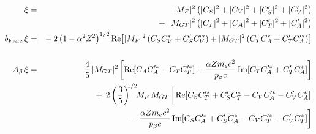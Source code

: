 %
%
%
\begin{eqnarray}
    \xi &=& 
    	|M_F|^2    \left( |C_S|^2 + |C_V|^2 + |C_S^\prime|^2 + |C_V^\prime|^2 \right) 
		\nonumber \\ && + \;\,
		|M_{GT}|^2 \left( |C_T|^2 + |C_A|^2 + |C_T^\prime|^2 + |C_A^\prime|^2 \right)
		\label{eq:jtw_xi_integrated} \\
    \bFierz \, \xi &=& 
    	- \: 2 %
		\left( 1-\alpha^2 Z^2 \right)^{1/2} 
		\textrm{Re}\!\left[ |M_F|^2 \left( C_S C_V^* + C_S^\prime C_V^{\prime *} \right) 
    	+ |M_{GT}|^2 \left( C_T C_A^* + C_T^{\prime} C_A^{\prime *} \right) \right] 
		\nonumber \\
    	\label{eq:jtw_bxi_integrated} \\
    \Abeta \, \xi &=& 
    	\frac{4}{5} \, |M_{GT}|^2 \left[ \textrm{Re}\!\left[ C_A C_A^{\prime *} - C_T C_T^{\prime *} \right] + \frac{\alpha Z \me c^2}{\pbeta c} \,\textrm{Im}\!\left[ C_T C_A^{\prime *} + C_T^\prime C_A^* \right] \right] 
		\nonumber \\ && + \;\, 
		2 %
		\left( \frac{3}{5} \right)^{\!\! 1/2} \!\!
		M_F\,M_{GT}  \left[ \phantom{\frac{1}{1}\!\!\!\!} \textrm{Re} \! \left[ C_S C_T^{\prime *} +  C_S^\prime C_T^* - C_V C_A^{\prime *} - C_V^\prime C_A^* \right] 
		\right.
		\nonumber \\ && - \;
		\left.
		\frac{\alpha Z \me c^2}{\pbeta c} \,\textrm{Im}\!\left[ C_S C_A^{\prime *} + C_S^\prime C_A^* - C_V C_T^{\prime *} -C_V^\prime C_T^* \right] \right]
	\label{eq:jtw_Abetaxi_integrated}
\end{eqnarray}
%
%